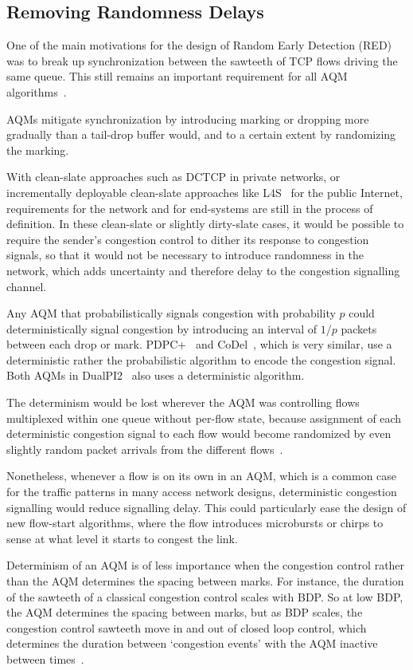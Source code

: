 \subsection{Removing Randomness Delays}\label{sec:rand_delay}

One of the main motivations for the design of Random Early Detection (RED)~\cite{Floyd93:RED} was to break up synchronization between the sawteeth of TCP flows driving the same queue. This still remains an important requirement for all AQM algorithms~\cite{Baker15:AQM_Recommendations}.

AQMs mitigate synchronization by introducing marking or dropping more gradually than a tail-drop buffer would, and to a certain extent by randomizing the marking. 

With clean-slate approaches such as DCTCP in private networks, or incrementally deployable clean-slate approaches like L4S~\cite{Briscoe16a:l4s-arch_ID} for the public Internet, requirements for the network and for end-systems are still in the process of definition. In these clean-slate or slightly dirty-slate cases, it would be possible to require the sender's congestion control to dither its response to congestion signals, so that it would not be necessary to introduce randomness in the network, which adds uncertainty and therefore delay to the congestion signalling channel. 

Any AQM that probabilistically signals congestion with probability \(p\) could deterministically signal congestion by introducing an interval of \(1/p\) packets between each drop or mark. PDPC+~\cite{Sagfors03:PDPC_vary} and CoDel~\cite{Nichols12:CoDel}, which is very similar, use a deterministic rather the probabilistic algorithm to encode the congestion signal. Both AQMs in DualPI2~\cite[Appx.\ A]{Briscoe15e:DualQ-Coupled-AQM_ID} also uses a deterministic algorithm.

The determinism would be lost wherever the AQM was controlling flows multiplexed within one queue without per-flow state, because assignment of each deterministic congestion signal to each flow would become randomized by even slightly random packet arrivals from the different flows~\cite{Briscoe15d:PIE_rvw}.

Nonetheless, whenever a flow is on its own in an AQM, which is a common case for the traffic patterns in many access network designs,  deterministic congestion signalling would reduce signalling delay. This could particularly ease the design of new flow-start algorithms, where the flow introduces microbursts or chirps to sense at what level it starts to congest the link.

Determinism of an AQM is of less importance when the congestion control rather than the AQM determines the spacing between marks. For instance, the duration of the sawteeth of a classical congestion control scales with BDP. So at low BDP, the AQM determines the spacing between marks, but as BDP scales, the congestion control sawteeth move in and out of closed loop control, which determines the duration between `congestion events' with the AQM inactive between times~\cite[\S\,3.3]{Briscoe21c:pi2param}.